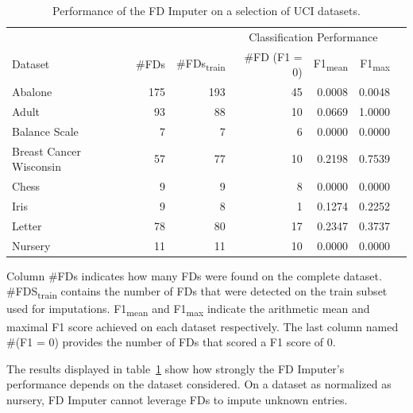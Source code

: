 \begin{table}[ht]
    \centering
    \begin{tabular}{lrrrrrr}
        & & & \multicolumn{3}{c}{Classification Performance} \\
        \cmidrule(lr{.25em}){4-6}
        Dataset & \#FDs & \#FDs\textsubscript{train} & \#FD (F1 = 0) & F1\textsubscript{mean} & F1\textsubscript{max} \\
        \midrule
        Abalone & 175 & 193 & 45 & 0.0008 & 0.0048 \\
        Adult & 93 & 88 & 10 & 0.0669 & 1.0000 \\
        Balance Scale & 7 & 7 & 6 & 0.0000 & 0.0000 \\
        Breast Cancer Wisconsin & 57 & 77 & 10 & 0.2198 & 0.7539 \\
        Chess & 9 & 9 & 8 & 0.0000 & 0.0000 \\
        Iris & 9 & 8 & 1 & 0.1274 & 0.2252 \\
        Letter & 78 & 80 & 17 & 0.2347 & 0.3737 \\
        Nursery & 11 & 11 & 10 & 0.0000 & 0.0000  \\
        \bottomrule
    \end{tabular}
    \caption{Performance of the FD Imputer on a selection of UCI datasets.}\label{tab:fd-imputer-performance}
\end{table}

Column \#FDs indicates how many FDs were found on the complete dataset.
\#FDS\textsubscript{train} contains the number of FDs that were detected on the train subset used for imputations.
F1\textsubscript{mean} and F1\textsubscript{max} indicate the arithmetic mean and maximal F1 score achieved on each dataset respectively.
The last column named \#(F1 = 0) provides the number of FDs that scored a F1 score of 0.

The results displayed in table~\ref{tab:fd-imputer-performance} show how strongly the FD Imputer's performance depends on the dataset considered.
On a dataset as normalized as nursery, FD Imputer cannot leverage FDs to impute unknown entries.

